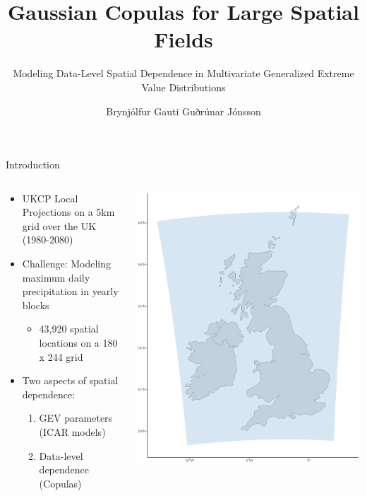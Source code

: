 \documentclass[
  ignorenonframetext,
]{beamer}
\title{Gaussian Copulas for Large Spatial Fields}
\subtitle{Modeling Data-Level Spatial Dependence in Multivariate
Generalized Extreme Value Distributions}
\author{Brynjólfur Gauti Guðrúnar Jónsson}
\date{}
\institute{University of Iceland}
\providecommand{\tightlist}{%
  \setlength{\itemsep}{0pt}\setlength{\parskip}{0pt}}\usepackage{longtable,booktabs,array}
\begin{document}
\frame{\titlepage}


\begin{frame}{Introduction}
\label{introduction}
\begin{columns}[T]
\begin{column}{0.7\textwidth}
\begin{itemize}
\tightlist
\item
  UKCP Local Projections on a 5km grid over the UK (1980-2080)
\item
  Challenge: Modeling maximum daily precipitation in yearly blocks

  \begin{itemize}
  \tightlist
  \item
    43,920 spatial locations on a 180 x 244 grid
  \end{itemize}
\item
  Two aspects of spatial dependence:

  \begin{enumerate}
  \tightlist
  \item
    GEV parameters (ICAR models)
  \item
    Data-level dependence (Copulas)
  \end{enumerate}
\end{itemize}
\end{column}

\begin{column}{0.3\textwidth}
\includegraphics[width=1\textwidth,height=\textheight]{images/ukcp_data.png}
\end{column}
\end{columns}
\end{frame}
\end{document}
